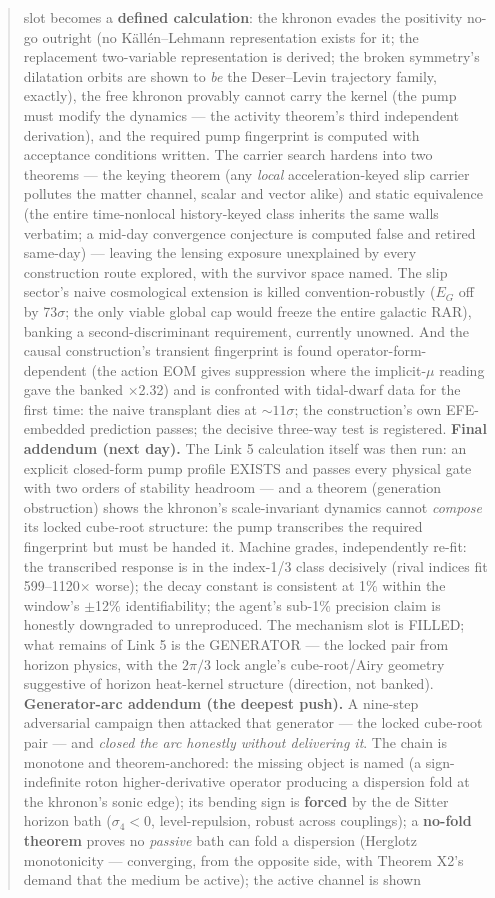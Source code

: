\documentclass[11pt,a4paper]{article}
\begin{document}
\begin{abstract}
slot becomes a \textbf{defined calculation}: the khronon evades the positivity no-go outright (no K\"all\'en--Lehmann representation exists for it; the replacement two-variable representation is derived; the broken symmetry's dilatation orbits are shown to \emph{be} the Deser--Levin trajectory family, exactly), the free khronon provably cannot carry the kernel (the pump must modify the dynamics --- the activity theorem's third independent derivation), and the required pump fingerprint is computed with acceptance conditions written. The carrier search hardens into two theorems --- the keying theorem (any \emph{local} acceleration-keyed slip carrier pollutes the matter channel, scalar and vector alike) and static equivalence (the entire time-nonlocal history-keyed class inherits the same walls verbatim; a mid-day convergence conjecture is computed false and retired same-day) --- leaving the lensing exposure unexplained by every construction route explored, with the survivor space named. The slip sector's naive cosmological extension is killed convention-robustly ($E_G$ off by 73$\sigma$; the only viable global cap would freeze the entire galactic RAR), banking a second-discriminant requirement, currently unowned. And the causal construction's transient fingerprint is found operator-form-dependent (the action EOM gives suppression where the implicit-$\mu$ reading gave the banked $\times$2.32) and is confronted with tidal-dwarf data for the first time: the naive transplant dies at ${\sim}11\sigma$; the construction's own EFE-embedded prediction passes; the decisive three-way test is registered. \textbf{Final addendum (next day).} The Link 5 calculation itself was then run: an explicit closed-form pump profile EXISTS and passes every physical gate with two orders of stability headroom --- and a theorem (generation obstruction) shows the khronon's scale-invariant dynamics cannot \emph{compose} its locked cube-root structure: the pump transcribes the required fingerprint but must be handed it. Machine grades, independently re-fit: the transcribed response is in the index-1/3 class decisively (rival indices fit 599--1120$\times$ worse); the decay constant is consistent at 1\% within the window's $\pm$12\% identifiability; the agent's sub-1\% precision claim is honestly downgraded to unreproduced. The mechanism slot is FILLED; what remains of Link 5 is the GENERATOR --- the locked pair from horizon physics, with the $2\pi/3$ lock angle's cube-root/Airy geometry suggestive of horizon heat-kernel structure (direction, not banked). \textbf{Generator-arc addendum (the deepest push).} A nine-step adversarial campaign then attacked that generator --- the locked cube-root pair --- and \emph{closed the arc honestly without delivering it}. The chain is monotone and theorem-anchored: the missing object is named (a sign-indefinite roton higher-derivative operator producing a dispersion fold at the khronon's sonic edge); its bending sign is \textbf{forced} by the de Sitter horizon bath ($\sigma_4 < 0$, level-repulsion, robust across couplings); a \textbf{no-fold theorem} proves no \emph{passive} bath can fold a dispersion (Herglotz monotonicity --- converging, from the opposite side, with Theorem X2's demand that the medium be active); the active channel is shown 
\end{abstract}
\end{document}
